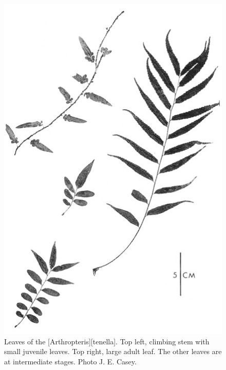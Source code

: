{\begin{figure}[!t]
\begin{minipage}[t]{0.7\textwidth}
\begin{minipage}[t]{(\textwidth-\fgap) * \real{0.496}}
				\caption[Leaves of the climbing fern \emph{Blechnum filiforme}]{Leaves of the  [Blechnum][filiforme].
				Top right, a small leaf from the base of a tree trunk.
				Left, large leaf from \SI{2}{\metre} above ground level.
				Lower right, fertile leaf.
				Photo: M. D. King.}%
				\label{fig:27fern}
			\end{minipage}\hspace{\fgap}%
			\begin{minipage}[t]{(\textwidth-\fgap) * \real{0.504}}
				\centering
				\includegraphics[width=\textwidth]{graphics/figure28fern.jpg}
				\caption[Leaves of the climbing fern \emph{Arthropteris tenella}]{Leaves of the  [Arthropteris][tenella].
				Top left, climbing stem with small juvenile leaves.
				Top right, large adult leaf.
				The other leaves are at intermediate stages.
				Photo  J. E. Casey.}%
				\label{fig:28fern}
			\end{minipage}
		\end{minipage}
	\end{figure}
}

